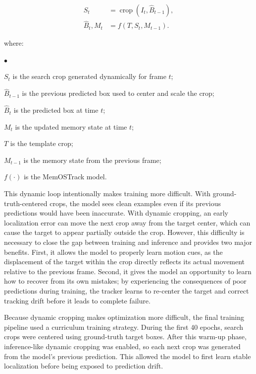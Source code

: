 \documentclass[bachelorthesis]{fer}
\numberwithin{equation}{chapter}
\newcommand{\FormulaNotationWith}[2]{%
    \vspace{-0.6em}
    \noindent\hspace*{1.2em}%
    \begin{minipage}{0.90\textwidth}
        \footnotesize
        #1
        \vspace{0.2em}
        \begin{list}{\(\bullet\)}{
            \setlength{\leftmargin}{1.4em}
            \setlength{\labelwidth}{0.8em}
            \setlength{\labelsep}{0.5em}
            \setlength{\itemsep}{0.05em}
            \setlength{\parsep}{0pt}
            \setlength{\topsep}{0.25em}
            \setlength{\partopsep}{0pt}
        }
            #2
        \end{list}
    \end{minipage}
    \par
    \vspace{0.8em}

}
\newcommand{\FormulaNotation}[1]{\FormulaNotationWith{where:}{#1}}
\begin{document}
    \begin{equation}
        \begin{aligned}
            S_t &= \operatorname{crop}(I_t, \hat{B}_{t-1}), \\
            \hat{B}_t, M_t &= f(T, S_t, M_{t-1}).
        \end{aligned}
    \end{equation}
    \FormulaNotation{
        \item \(S_t\) is the search crop generated dynamically for frame \(t\);
        \item \(\hat{B}_{t-1}\) is the previous predicted box used to center and scale the crop;
        \item \(\hat{B}_t\) is the predicted box at time \(t\);
        \item \(M_t\) is the updated memory state at time \(t\);
        \item \(T\) is the template crop;
        \item \(M_{t-1}\) is the memory state from the previous frame;
        \item \(f(\cdot)\) is the MemOSTrack model.
    }

    This dynamic loop intentionally makes training more difficult. With ground-truth-centered crops, the model sees clean examples even if its previous predictions would have been inaccurate. With dynamic cropping, an early localization error can move the next crop away from the target center, which can cause the target to appear partially outside the crop. However, this difficulty is necessary to close the gap between training and inference and provides two major benefits. First, it allows the model to properly learn motion cues, as the displacement of the target within the crop directly reflects its actual movement relative to the previous frame. Second, it gives the model an opportunity to learn how to recover from its own mistakes; by experiencing the consequences of poor predictions during training, the tracker learns to re-center the target and correct tracking drift before it leads to complete failure.

    Because dynamic cropping makes optimization more difficult, the final training pipeline used a curriculum training strategy.
    During the first 40 epochs, search crops were centered using ground-truth target boxes. After this warm-up phase,
    inference-like dynamic cropping was enabled, so each next crop was generated from the model's previous prediction. This
    allowed the model to first learn stable localization before being exposed to prediction drift.
\end{document}
